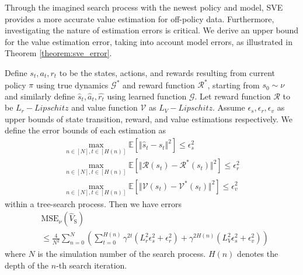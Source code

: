 Through the imagined search process with the newest policy and model, SVE provides a more accurate value estimation for off-policy data. Furthermore, investigating the nature of estimation errors is critical. We derive an upper bound for the value estimation error, taking into account model errors, as illustrated in Theorem \ref{theorem:sve_error}.


\begin{corollary}
\label{theorem:sve_error}
    Define $s_t,a_t,r_t$ to be the states, actions, and rewards resulting from current policy $\pi$ using true dynamics $\mathcal{G}^*$ and reward function $\mathcal{R}^*$, starting from $s_0\sim\nu$ and similarly define $\hat{s}_t, \hat{a}_t, \hat{r_t}$ using learned function $\mathcal{G}$. Let reward function $\mathcal{R}$ to be $L_r-Lipschitz$ and value function $\mathcal{V}$ as $L_V-Lipschitz$. Assume $\epsilon_s, \epsilon_r, \epsilon_v$ as upper bounds of state transition, reward, and value estimations respectively. We define the error bounds of each estimation as
    \begin{gather}
        \max_{n\in[N],t\in[H(n)]}\mathbb{E}\left[\Vert\hat{s}_t-s_t\Vert^2\right]\leq\epsilon_s^2 \\
        \max_{n\in[N],t\in[H(n)]}\mathbb{E}\left[\Vert\mathcal{R}(s_t)-\mathcal{R}^*(s_t)\Vert^2\right]\leq\epsilon_r^2 \\
        \max_{n\in[N],t\in[H(n)]}\mathbb{E}\left[\Vert\mathcal{V}(s_t)-\mathcal{V}^*(s_t)\Vert^2\right]\leq\epsilon_v^2
    \end{gather}
    within a tree-search process. Then we have errors
    \begin{equation}
    \begin{aligned}
        &\text{MSE}_\nu(\hat{V}_\text{S})\\
        &\leq\frac{4}{N^2}\sum_{n=0}^N\left(\sum_{t=0}^{H(n)}\gamma^{2t}(L_r^2\epsilon_s^2+\epsilon_r^2)+\gamma^{2H(n)}(L_V^2\epsilon_s^2+\epsilon_v^2)\right)
    \end{aligned}
    \end{equation}
    where $N$ is the simulation number of the search process. $H(n)$ denotes the depth of the $n$-th search iteration.
\end{corollary}

